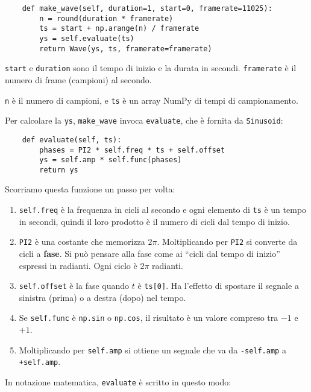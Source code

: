 \documentclass[12pt,a4paper]{book}
\begin{document}
\begin{verbatim} 
    def make_wave(self, duration=1, start=0, framerate=11025):
        n = round(duration * framerate)
        ts = start + np.arange(n) / framerate
        ys = self.evaluate(ts)
        return Wave(ys, ts, framerate=framerate)
 \end{verbatim} 

{\tt start} e {\tt duration} sono il tempo di inizio e la durata in secondi. {\tt framerate} è il numero di frame (campioni) al secondo.

{\tt n} è il numero di campioni, e {\tt ts} è un array NumPy di tempi di campionamento.

Per calcolare la {\tt ys}, \verb"make_wave" invoca {\tt evaluate}, che è fornita da {\tt Sinusoid}:

\begin{verbatim} 
    def evaluate(self, ts):
        phases = PI2 * self.freq * ts + self.offset
        ys = self.amp * self.func(phases)
        return ys
 \end{verbatim} 

Scorriamo questa funzione un passo per volta:

\begin{enumerate} 

\item {\tt self.freq} è la frequenza in cicli al secondo e ogni elemento di {\tt ts} è un tempo in secondi, quindi il loro prodotto è il numero di cicli dal tempo di inizio.

\item {\tt PI2} è una costante che memorizza $2 \pi$. Moltiplicando per {\tt PI2} si converte da cicli a {\bf fase}. Si può pensare alla fase come ai ``cicli dal tempo di inizio'' espressi in radianti. Ogni ciclo è $2 \pi$ radianti.

\item {\tt self.offset} è la fase quando $t$ è {\tt ts[0]}. Ha l'effetto di spostare il segnale a sinistra (prima) o a destra (dopo) nel tempo.

\item Se {\tt self.func} è {\tt np.sin} o {\tt np.cos}, il risultato è un valore compreso tra $-1$ e $+1$.

\item Moltiplicando per {\tt self.amp} si ottiene un segnale che va da {\tt -self.amp} a {\tt +self.amp}.

\end{enumerate} 

In notazione matematica, {\tt evaluate} è scritto in questo modo:
\end{document}
